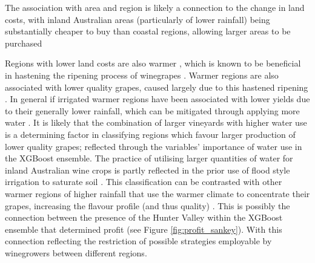 \documentclass[review,12pt,authoryear]{elsarticle}
\begin{document}
\begin{linenumbers}
The association with area and region is likely a connection to the change in land costs, with inland Australian areas (particularly of lower rainfall) being substantially cheaper to buy than coastal regions, allowing larger areas to be purchased \citep{willchancellorMeasuringAustralianBroadacre2019} %
\par
Regions with lower land costs are also warmer \citep{willchancellorMeasuringAustralianBroadacre2019}, which is known to be beneficial in hastening the ripening process of winegrapes \citep{webbObservedTrendsWinegrape2011}. Warmer regions are also associated with lower quality grapes, caused largely due to this hastened ripening \citep{botting1996canopy}. In general if irrigated warmer regions have been associated with lower yields due to their generally lower rainfall, which can be mitigated through applying more water \citep{campsGrapeHarvestYield2012}. %
It is likely that the combination of larger vineyards with higher water use is a determining factor in classifying regions which favour larger production of lower quality grapes; reflected through the variables' importance of water use in the XGBoost ensemble. %
The practice of utilising larger quantities of water for inland Australian wine crops is partly reflected in the prior use of flood style irrigation to saturate soil \citep{bgcoombeGrapeBerryDevelopment2004}. %
This classification can be contrasted with other warmer regions of higher rainfall that use the warmer climate to concentrate their grapes, increasing the flavour profile (and thus quality) \citep{goodwinijeriepRegulatedDeficitIrrigation1992,mgmccarthyEffectCropLoad1986}. This is possibly the connection between the presence of the Hunter Valley within the XGBoost ensemble that determined profit (see Figure \ref{fig:profit_sankey}). With this connection reflecting the restriction of possible strategies employable by winegrowers between different regions. %

\end{linenumbers}
\end{document}
